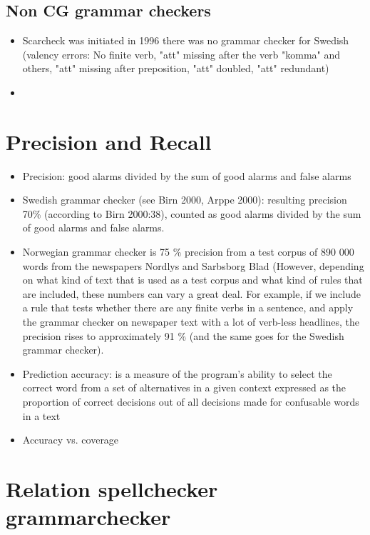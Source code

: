 \documentclass[a4paper,english,12pt]{article}
\begin{document}
\begin{spacing}{1.0}
\subsection{Non CG grammar checkers}

\begin{itemize}
\item Scarcheck was initiated in 1996 there was no grammar checker for Swedish (valency errors: No finite verb, "att" missing after the verb "komma" and others, "att" missing after preposition, "att" doubled, "att" redundant)
\item 
\end{itemize}

\section{Precision and Recall}

\begin{itemize}
\item Precision: good alarms divided by the sum of good alarms and false alarms
\item Swedish grammar checker (see Birn 2000, Arppe 2000): resulting precision 70\% (according to Birn 2000:38), counted as good alarms divided by the sum of good alarms and false alarms. 
\item Norwegian grammar checker is 75 \% precision from a test corpus of 890 000 words from the newspapers Nordlys and Sarbsborg Blad \citet{Hagen2001a} (However, depending on what kind of text that is used as a test corpus and what kind of rules that are included, these numbers can vary a great deal. For example, if we include a rule that tests whether there are any finite verbs in a sentence, and apply the grammar checker on newspaper text with a lot of verb-less headlines, the precision rises to approximately 91 \% (and the same goes for the Swedish grammar checker).
\item Prediction accuracy: is a measure of the program's ability to select the correct word from a set of alternatives in a given context expressed as the proportion of correct decisions out of all decisions made for confusable words in a text \citet{Pedler2007} 
\item Accuracy vs. coverage \citet[p.186]{Pedler2007}
\end{itemize}

\section{Relation spellchecker grammarchecker}


\end{spacing}
\end{document}
